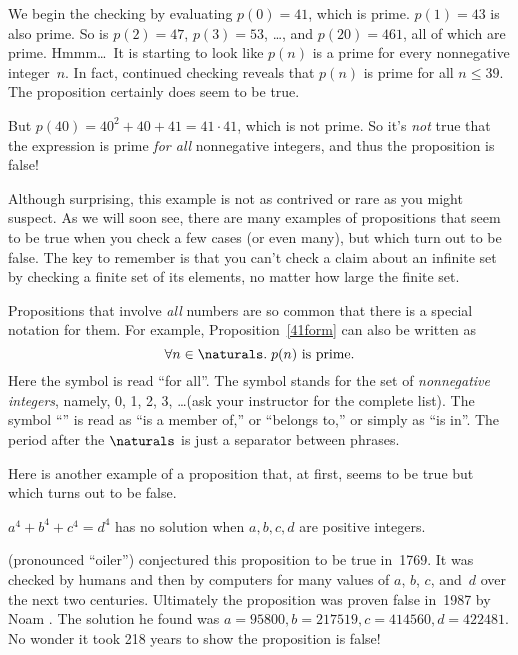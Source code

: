 We begin the checking by evaluating $p(0) = 41$, which is prime.
$p(1) = 43$ is also prime.  So is $p(2) = 47$, $p(3)=53$, \dots, and
$p(20) = 461$, all of which are prime.  Hmmm\dots\ It is starting to
look like $p(n)$ is a prime for every nonnegative integer~$n$.  In
fact, continued checking reveals that $p(n)$ is prime for all $n \le
39$.
The proposition certainly does seem to be true.

But $p(40) = 40^2 + 40 + 41 = 41 \cdot 41$, which is not prime.  So
it's \emph{not} true that the expression is prime \emph{for all}
nonnegative integers, and thus the proposition is false!

Although surprising, this example is not as contrived or rare as you
might suspect.  As we will soon see, there are many examples of
propositions that seem to be true when you check a few cases (or even
many), but
which turn out to be false.  The key to remember is that you
can't check a claim about an infinite
set by checking a finite set of its elements, no matter how large the
finite set.

Propositions that involve \emph{all} numbers
are so common that there is a special notation for them.  For example,
Proposition~\ref{41form} can also be written as
\begin{equation}\label{pn}
\forall n \in \naturals.\; p(n) \text{ is prime}.
\end{equation}
Here the symbol \term{$\forall$} is read ``for all''.  The symbol
\term{$\naturals$} stands for the set of \emph{nonnegative integers},
namely, 0, 1, 2, 3, \dots (ask your instructor for the complete list).
The symbol ``\term{$\in$}'' is read as ``is a member of,'' or
``belongs to,'' or simply as ``is in''.  The period after the
$\naturals$ is just a separator between phrases.

\iffalse
\begin{notesproblem}
Show that no nonconstant polynomial can map all nonnegative integers into
prime numbers.  (This can be proved using elementary algebra, but it's a
little tricky.  It will be easier to show after we study modular
arithmetic later in the term.)
\end{notesproblem}
\fi

Here is another example of a proposition that, at first, seems to be
true but which turns out to be false.
\begin{proposition}\label{a4}
$a^4 + b^4 + c^4 = d^4$ has no solution when $a, b, c, d$ are positive
integers.
\end{proposition}
 (pronounced ``oiler'') conjectured this proposition to be
true in~1769.  It was checked by humans and then by computers for many
values of $a$, $b$, $c$, and~$d$ over the next two centuries.
Ultimately the proposition was proven false in~1987 by Noam
.  The solution he found was $a = 95800, b = 217519, c =
414560, d = 422481$.  No wonder it took 218 years to show the
proposition is false!

